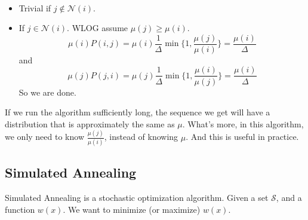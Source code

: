         \begin{sketchproof}~{}
            \begin{itemize}
                \item Trivial if $j \notin \mathcal{N}(i)$.
                \item If $j \in \mathcal{N}(i)$. WLOG assume $\mu(j) \ge \mu(i)$.
                \[ \mu(i)P(i,j) = \mu(i)\frac{1}{\Delta}\min\{1,\frac{\mu(j)}{\mu(i)}\} = \frac{\mu(i)}{\Delta} \]
                and
                \[ \mu(j)P(j,i) = \mu(j)\frac{1}{\Delta}\min\{1,\frac{\mu(i)}{\mu(j)}\} = \frac{\mu(i)}{\Delta} \]
                So we are done.
            \end{itemize}
        \end{sketchproof}
        \begin{remark}
            If we run the algorithm sufficiently long, the sequence we get will have a distribution that is approximately the same as $\mu$. What's more, in this algorithm, we only need to know $\frac{\mu(j)}{\mu(i)}$, instead of knowing $\mu$. And this is useful in practice.
        \end{remark}

    \subsection{Simulated Annealing}
        \par Simulated Annealing is a stochastic optimization algorithm. Given a set $\mathcal{S}$, and a function $w(x)$. We want to minimize (or maximize) $w(x)$.

